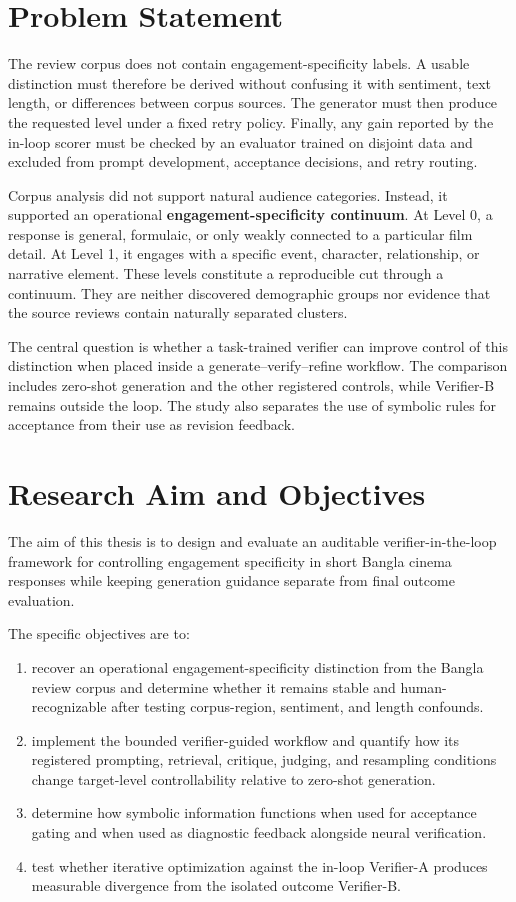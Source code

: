 \section{Problem Statement}

The review corpus does not contain engagement-specificity labels. A usable distinction must therefore be derived without confusing it with sentiment, text length, or differences between corpus sources. The generator must then produce the requested level under a fixed retry policy. Finally, any gain reported by the in-loop scorer must be checked by an evaluator trained on disjoint data and excluded from prompt development, acceptance decisions, and retry routing.

Corpus analysis did not support natural audience categories. Instead, it supported an operational \textbf{engagement-specificity continuum}. At Level 0, a response is general, formulaic, or only weakly connected to a particular film detail. At Level 1, it engages with a specific event, character, relationship, or narrative element. These levels constitute a reproducible cut through a continuum. They are neither discovered demographic groups nor evidence that the source reviews contain naturally separated clusters.

The central question is whether a task-trained verifier can improve control of this distinction when placed inside a generate–verify–refine workflow. The comparison includes zero-shot generation and the other registered controls, while Verifier-B remains outside the loop. The study also separates the use of symbolic rules for acceptance from their use as revision feedback.

\section{Research Aim and Objectives}

The aim of this thesis is to design and evaluate an auditable verifier-in-the-loop framework for controlling engagement specificity in short Bangla cinema responses while keeping generation guidance separate from final outcome evaluation.

The specific objectives are to:

\begin{enumerate}
\item recover an operational engagement-specificity distinction from the Bangla review corpus and determine whether it remains stable and human-recognizable after testing corpus-region, sentiment, and length confounds.
\item implement the bounded verifier-guided workflow and quantify how its registered prompting, retrieval, critique, judging, and resampling conditions change target-level controllability relative to zero-shot generation.
\item determine how symbolic information functions when used for acceptance gating and when used as diagnostic feedback alongside neural verification.
\item test whether iterative optimization against the in-loop Verifier-A produces measurable divergence from the isolated outcome Verifier-B.
\end{enumerate}

